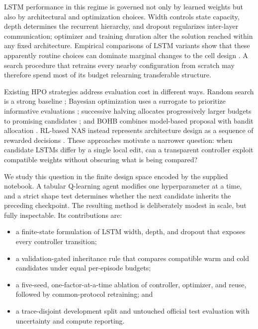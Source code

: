 \documentclass[conference]{IEEEtran}
\begin{document}
LSTM performance in this regime is governed not only by learned weights but also by architectural and optimization choices. Width controls state capacity, depth determines the recurrent hierarchy, and dropout regularizes inter-layer communication; optimizer and training duration alter the solution reached within any fixed architecture. Empirical comparisons of LSTM variants show that these apparently routine choices can dominate marginal changes to the cell design \cite{hochreiter1997lstm,greff2017search}. A search procedure that retrains every nearby configuration from scratch may therefore spend most of its budget relearning transferable structure.

Existing HPO strategies address evaluation cost in different ways. Random search is a strong baseline \cite{bergstra2012random}; Bayesian optimization uses a surrogate to prioritize informative evaluations \cite{snoek2012practical}; successive halving allocates progressively larger budgets to promising candidates \cite{jamieson2016nonstochastic,li2018hyperband}; and BOHB combines model-based proposal with bandit allocation \cite{falkner2018bohb}. RL-based NAS instead represents architecture design as a sequence of rewarded decisions \cite{zoph2017nas}. These approaches motivate a narrower question: when candidate LSTMs differ by a single local edit, can a transparent controller exploit compatible weights without obscuring what is being compared?

We study this question in the finite design space encoded by the supplied notebook. A tabular Q-learning agent modifies one hyperparameter at a time, and a strict shape test determines whether the next candidate inherits the preceding checkpoint. The resulting method is deliberately modest in scale, but fully inspectable. Its contributions are:
\begin{itemize}
    \item a finite-state formulation of LSTM width, depth, and dropout that exposes every controller transition;
    \item a validation-gated inheritance rule that compares compatible warm and cold candidates under equal per-episode budgets;
    \item a five-seed, one-factor-at-a-time ablation of controller, optimizer, and reuse, followed by common-protocol retraining; and
    \item a trace-disjoint development split and untouched official test evaluation with uncertainty and compute reporting.
\end{itemize}
\end{document}
